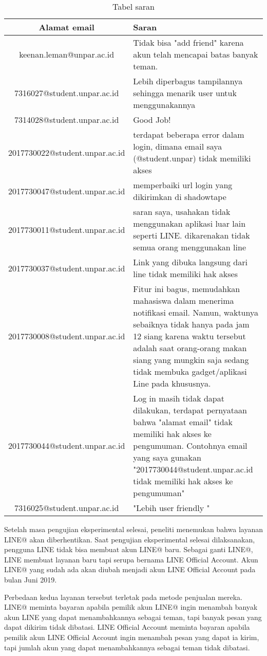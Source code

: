 \begin{center}
	\begin{table}[H]
	\caption{Tabel saran}
	\label{table:saran}
	\begin{tabular}{|c|p{11cm}|}
	\hline
  Alamat email	& Saran\\
  \hline
  keenan.leman@unpar.ac.id	& Tidak bisa "add friend" karena akun telah mencapai batas banyak teman.\\
  \hline
  7316027@student.unpar.ac.id	& Lebih diperbagus tampilannya sehingga menarik user untuk menggunakannya\\
  \hline
  7314028@student.unpar.ac.id	& Good Job!\\
  \hline
  2017730022@student.unpar.ac.id	& terdapat beberapa error dalam login, dimana email saya (@student.unpar) tidak memiliki akses\\
  \hline
  2017730047@student.unpar.ac.id	& memperbaiki url login yang dikirimkan di shadowtape\\
  \hline
  2017730011@student.unpar.ac.id	& saran saya, usahakan tidak menggunakan aplikasi luar lain seperti LINE. dikarenakan tidak semua orang menggunakan line\\
  \hline
  2017730037@student.unpar.ac.id	& Link yang dibuka langsung dari line tidak memiliki hak akses\\
  \hline
  2017730008@student.unpar.ac.id	& Fitur ini bagus, memudahkan mahasiswa dalam menerima notifikasi email. Namun, waktunya sebaiknya tidak hanya pada jam 12 siang karena waktu tersebut adalah saat orang-orang makan siang yang mungkin saja sedang tidak membuka gadget/aplikasi Line pada khususnya.\\
  \hline
  2017730044@student.unpar.ac.id	& Log in masih tidak dapat dilakukan, terdapat pernyataan bahwa "alamat email" tidak memiliki hak akses ke pengumuman. Contohnya email yang saya gunakan "2017730044@student.unpar.ac.id tidak memiliki hak akses ke pengumuman"\\
  \hline
  7316025@student.unpar.ac.id	& "Lebih user friendly
"\\
  \hline
	\end{tabular}
	\end{table}
\end{center}

Setelah masa pengujian eksperimental selesai, peneliti menemukan bahwa layanan LINE@ akan diberhentikan. Saat pengujian eksperimental selesai dilaksanakan, pengguna LINE tidak bisa membuat akun LINE@ baru. Sebagai ganti LINE@, LINE membuat layanan baru tapi serupa bernama LINE Official Account. Akun LINE@ yang sudah ada akan diubah menjadi akun LINE Official Account pada bulan Juni 2019.

Perbedaan kedua layanan tersebut terletak pada metode penjualan mereka. LINE@ meminta bayaran apabila pemilik akun LINE@ ingin menambah banyak akun LINE yang dapat menambahkannya sebagai teman, tapi banyak pesan yang dapat dikirim tidak dibatasi. LINE Official Account meminta bayaran apabila pemilik akun LINE Official Account ingin menambah pesan yang dapat ia kirim, tapi jumlah akun yang dapat menambahkannya sebagai teman tidak dibatasi.